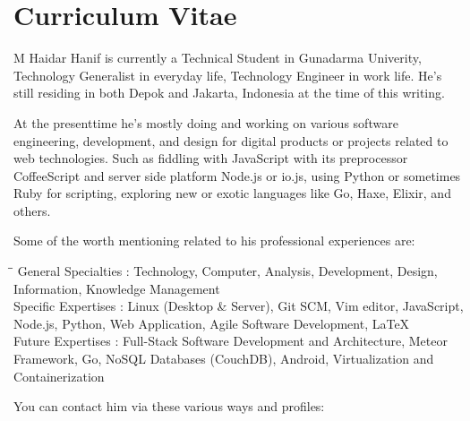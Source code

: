 \cleardoublepage
{}

\thispagestyle{empty}

\chapter*{Curriculum Vitae}
\label{chap:cv}

\begin{figure}[htb]
    \centering
    \label{fig:cv:mhaidarhanif}
\end{figure}

M Haidar Hanif is currently a Technical Student in Gunadarma Univerity, Technology Generalist in everyday life, Technology Engineer in work life.
He's still residing in both Depok and Jakarta, Indonesia at the time of this writing.

At the presenttime he's mostly doing and working on various software engineering, development, and design for digital products or projects related to web technologies.
Such as fiddling with JavaScript with its preprocessor CoffeeScript and server side platform Node.js or io.js, using Python or sometimes Ruby for scripting, exploring new or exotic languages like Go, Haxe, Elixir, and others.

Some of the worth mentioning related to his professional experiences are:

\begin{tabbing}
\hspace*{5cm}\=\hspace*{0.5cm}\= \kill
General Specialties \>:\> Technology, Computer, Analysis, Development, Design, Information, Knowledge Management \\
Specific Expertises \>:\> Linux (Desktop \& Server), Git SCM, Vim editor, JavaScript, Node.js, Python, Web Application, Agile Software Development, LaTeX \\
Future Expertises \>:\> Full-Stack Software Development and Architecture, Meteor Framework, Go, NoSQL Databases (CouchDB), Android, Virtualization and Containerization \\
\end{tabbing}

You can contact him via these various ways and profiles:

